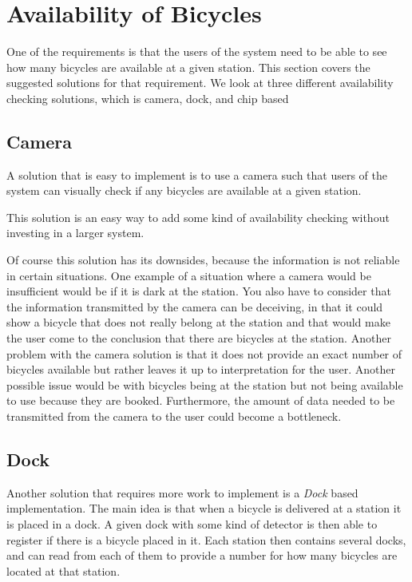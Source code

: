 \section{Availability of Bicycles}\label{sec:availability}
One of the requirements is that the users of the system need to be able to see how many bicycles are available at a given station.
This section covers the suggested solutions for that requirement.
We look at three different availability checking solutions, which is camera, dock, and chip based

\subsection{Camera}
A solution that is easy to implement is to use a camera such that users of the system can visually check if any bicycles are available at a given station. 

This solution is an easy way to add some kind of availability checking without investing in a larger system.

Of course this solution has its downsides, because the information is not reliable in certain situations. 
One example of a situation where a camera would be insufficient would be if it is dark at the station.
You also have to consider that the information transmitted by the camera can be deceiving, in that it could show a bicycle that does not really belong at the station and that would make the user come to the conclusion that there are bicycles at the station.
Another problem with the camera solution is that it does not provide an exact number of bicycles available but rather leaves it up to interpretation for the user.
Another possible issue would be with bicycles being at the station but not being available to use because they are booked.
Furthermore, the amount of data needed to be transmitted from the camera to the user could become a bottleneck.

\subsection{Dock}
Another solution that requires more work to implement is a \textit{Dock} based implementation.
The main idea is that when a bicycle is delivered at a station it is placed in a dock.
A given dock with some kind of detector is then able to register if there is a bicycle placed in it.
Each station then contains several docks, and can read from each of them to provide a number for how many bicycles are located at that station. 

